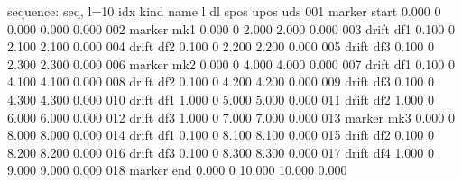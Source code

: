 \documentclass[letterpaper,10pt,english]{sphinxmanual}
\begin{document}
\begin{sphinxVerbatim}[commandchars=\\\{\}]
     
  
             
             
             
            

\end{sphinxVerbatim}

\begin{sphinxVerbatim}[commandchars=\\\{\}]
sequence: seq, l=10
idx  kind          name      l          dl       spos       upos    uds
001  marker        \PYGZdl{}start    0.000       0       0.000      0.000   0.000
002  marker        mk1       0.000       0       2.000      2.000   0.000
003  drift         df1       0.100       0       2.100      2.100   0.000
004  drift         df2       0.100       0       2.200      2.200   0.000
005  drift         df3       0.100       0       2.300      2.300   0.000
006  marker        mk2       0.000       0       4.000      4.000   0.000
007  drift         df1       0.100       0       4.100      4.100   0.000
008  drift         df2       0.100       0       4.200      4.200   0.000
009  drift         df3       0.100       0       4.300      4.300   0.000
010  drift         df1\PYGZsq{}      1.000       0       5.000      5.000   0.000
011  drift         df2\PYGZsq{}      1.000       0       6.000      6.000   0.000
012  drift         df3\PYGZsq{}      1.000       0       7.000      7.000   0.000
013  marker        mk3       0.000       0       8.000      8.000   0.000
014  drift         df1       0.100       0       8.100      8.100   0.000
015  drift         df2       0.100       0       8.200      8.200   0.000
016  drift         df3       0.100       0       8.300      8.300   0.000
017  drift         df4       1.000       0       9.000      9.000   0.000
018  marker        \PYGZdl{}end      0.000       0      10.000     10.000   0.000
\end{sphinxVerbatim}
\end{document}
